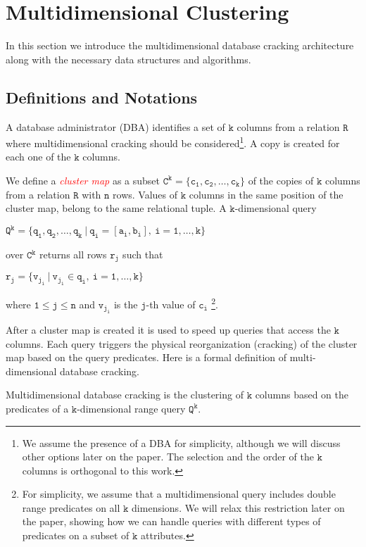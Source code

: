 \section{Multidimensional Clustering}
\label{sec:adaptive_partitioning}

In this section we introduce the multidimensional database cracking 
architecture along with the necessary data structures and algorithms.

\subsection{Definitions and Notations}
\label{subsec:clustering}


A database administrator (DBA) identifies a set of $\mathtt{k}$ columns from a
relation $\mathtt{R}$ where multidimensional cracking should be 
considered\footnote{We assume the presence of a DBA for simplicity,
although we will discuss other options later on the paper.
The selection and the order of the $\mathtt{k}$ columns is orthogonal
to this work.}.
A copy is created for each one of the $\mathtt{k}$ columns.

We define a \textcolor{red}{\emph{cluster map}} as a subset $\mathtt{C^k=\{c_1,c_2,\ldots,c_k\}}$ of the copies of
$\mathtt{k}$ columns from a relation $\mathtt{R}$ with $\mathtt{n}$ rows. 
Values of $\mathtt{k}$ columns in the same position of the cluster map, belong to the same relational tuple.
A 
$\mathtt{k}$-dimensional query
\begin{center}
$\mathtt{Q^k = \{q_1,q_2,\ldots,q_k\ |\ q_i = [a_i, b_i],\ i=1,\ldots,k\}}$ 
\end{center}
over $\mathtt{C^k}$ returns all rows $\mathtt{r_j}$ such that
\begin{center}
$\mathtt{r_j = \{v_{j_i}\ |\ v_{j_i} \in q_i,\ i=1,\ldots,k\}}$
\end{center}
where $\mathtt{1 \leq j \leq n}$ and $\mathtt{v_{j_i}}$ is the $\mathtt{j}$-th value of $\mathtt{c_i}$
\footnote{For simplicity, we assume that a multidimensional query includes double range predicates on all $\mathtt{k}$ dimensions.
We will relax this restriction later on the paper, showing how we can handle queries with different types of predicates on a subset of $\mathtt{k}$ attributes.}.

After a cluster map is created it is used to speed up queries that access the $\mathtt{k}$ columns.
Each query triggers the physical reorganization (cracking) of the cluster map based on the query predicates.
Here is a formal definition of multi-dimensional database cracking.

\begin{flushleft}
\begin{mydef}
Multidimensional database cracking is the clustering of 
$\mathtt{k}$ columns based on the predicates of a $\mathtt{k}$-dimensional
range query $\mathtt{Q^k}$.
\end{mydef}
\end{flushleft}







